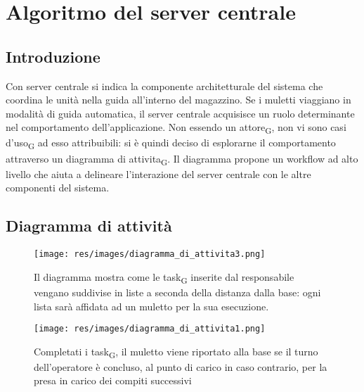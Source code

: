 \section{Algoritmo del server centrale}
\subsection{Introduzione}
Con server centrale si indica la componente architetturale del sistema che coordina le unità nella guida all'interno del magazzino. Se i muletti viaggiano in modalità di guida automatica, il server centrale acquisisce un ruolo determinante nel comportamento dell'applicazione. Non essendo un attore\textsubscript{G}, non vi sono casi d'uso\textsubscript{G} ad esso attribuibili: si è quindi deciso di esplorarne il comportamento attraverso un diagramma di attivita\textsubscript{G}. Il diagramma propone un workflow ad alto livello che aiuta a delineare l'interazione del server centrale con le altre componenti del sistema.



\subsection{Diagramma di attività}

\begin{figure}[H]
	\centering
	\texttt{[image: res/images/diagramma\_di\_attivita3.png]}
	\caption[Diagramma di attivita\textsubscript{G} per l'ordinamento  delle tasks]{Il diagramma mostra come le task\textsubscript{G} inserite dal responsabile vengano suddivise in liste a seconda della distanza dalla base: ogni lista sarà affidata ad un muletto per la sua esecuzione.}
\end{figure}

\begin{figure}[H]
	\centering
	\texttt{[image: res/images/diagramma\_di\_attivita1.png]}
	\caption[Diagramma di attivita\textsubscript{G} per la gestione del muletto dopo il completamento della lista di tasks]{Completati i task\textsubscript{G}, il muletto viene riportato alla base se il turno dell'operatore è concluso, al punto di carico in caso contrario, per la presa in carico dei compiti successivi}
\end{figure}



